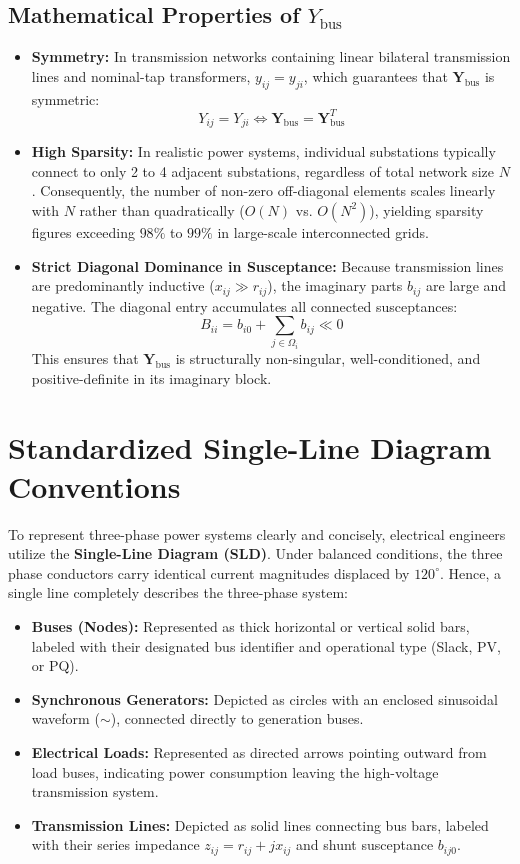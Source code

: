 \documentclass[12pt,a4paper,oneside]{report}
\begin{document}
\subsection{Mathematical Properties of $Y_{\text{bus}}$}
\begin{itemize}
    \item \textbf{Symmetry:} In transmission networks containing linear bilateral transmission lines and nominal-tap transformers, $y_{ij} = y_{ji}$, which guarantees that $\mathbf{Y}_{\text{bus}}$ is symmetric:
    \begin{equation}
    Y_{ij} = Y_{ji} \iff \mathbf{Y}_{\text{bus}} = \mathbf{Y}_{\text{bus}}^T
    \end{equation}
    \item \textbf{High Sparsity:} In realistic power systems, individual substations typically connect to only 2 to 4 adjacent substations, regardless of total network size $N$. Consequently, the number of non-zero off-diagonal elements scales linearly with $N$ rather than quadratically ($O(N)$ vs. $O(N^2)$), yielding sparsity figures exceeding $98\%$ to $99\%$ in large-scale interconnected grids.
    \item \textbf{Strict Diagonal Dominance in Susceptance:} Because transmission lines are predominantly inductive ($x_{ij} \gg r_{ij}$), the imaginary parts $b_{ij}$ are large and negative. The diagonal entry accumulates all connected susceptances:
    \begin{equation}
    B_{ii} = b_{i0} + \sum_{j \in \Omega_i} b_{ij} \ll 0
    \end{equation}
    This ensures that $\mathbf{Y}_{\text{bus}}$ is structurally non-singular, well-conditioned, and positive-definite in its imaginary block.
\end{itemize}

\section{Standardized Single-Line Diagram Conventions}
To represent three-phase power systems clearly and concisely, electrical engineers utilize the \textbf{Single-Line Diagram (SLD)}. Under balanced conditions, the three phase conductors carry identical current magnitudes displaced by $120^\circ$. Hence, a single line completely describes the three-phase system:
\begin{itemize}
    \item \textbf{Buses (Nodes):} Represented as thick horizontal or vertical solid bars, labeled with their designated bus identifier and operational type (Slack, PV, or PQ).
    \item \textbf{Synchronous Generators:} Depicted as circles with an enclosed sinusoidal waveform ($\sim$), connected directly to generation buses.
    \item \textbf{Electrical Loads:} Represented as directed arrows pointing outward from load buses, indicating power consumption leaving the high-voltage transmission system.
    \item \textbf{Transmission Lines:} Depicted as solid lines connecting bus bars, labeled with their series impedance $z_{ij} = r_{ij} + jx_{ij}$ and shunt susceptance $b_{ij0}$.
\end{itemize}
\end{document}
